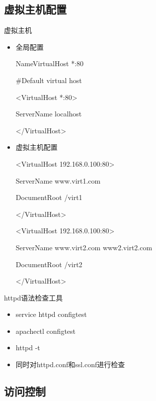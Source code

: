 \subsection{虚拟主机配置}

\begin{frame}{虚拟主机}
\begin{itemize}
\item 全局配置


NameVirtualHost {*}:80


\#Default virtual host


<VirtualHost {*}:80>


ServerName localhost


</VirtualHost>

\item 虚拟主机配置


<VirtualHost 192.168.0.100:80>


ServerName  www.virt1.com


DocumentRoot /virt1


</VirtualHost>


<VirtualHost 192.168.0.100:80>


ServerName   www.virt2.com www2.virt2.com


DocumentRoot /virt2


</VirtualHost>

\end{itemize}

\end{frame} 
\begin{frame}{httpd语法检查工具}
\begin{itemize}
\item service httpd configtest
\item apachectl configtest
\item httpd -t
\item 同时对httpd.conf和ssl.conf进行检查
\end{itemize}

\end{frame} 
\subsection{访问控制}


